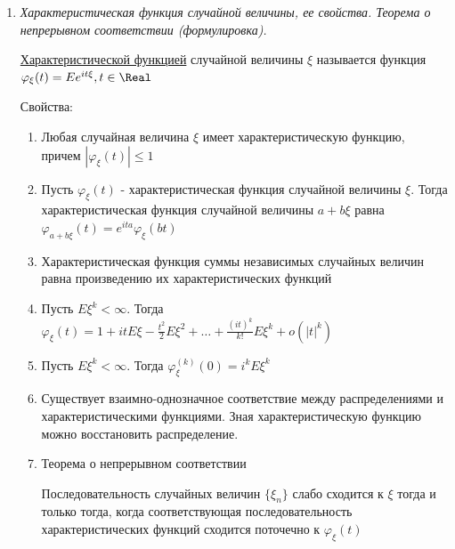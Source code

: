 \documentclass[12pt]{article}
\begin{document}
\begin{enumerate}
\begin{enumerate}
\begin{enumerate}
            \item Если $r_{\xi,\eta} = -1$, то $\eta = a\xi + b$ и $a < 0$ (обратная линейная зависимость)
        \end{enumerate}
    \end{enumerate}

    Если $r_{\xi,\eta} \neq 0$, то говорят, что случайные величины коррелированы друг с другом. Если $r_{\xi,\eta} > 0$, 
    то имеет прямая корреляция, если $r_{\xi,\eta} < 0$ - обратная

    \item \textit{Характеристическая функция случайной величины, ее свойства. Теорема о непрерывном соответствии (формулировка).}

    \hyperlink{characteristicfunction}{Характеристической функцией} случайной величины $\xi$ называется функция $\varphi_\xi(t) = Ee^{it\xi}, t \in \Real$
    
    Свойства:

    \begin{enumerate}
        \item Любая случайная величина $\xi$ имеет характеристическую функцию, причем $|\varphi_\xi(t)| \leq 1$

        \item Пусть $\varphi_\xi(t)$ - характеристическая функция случайной величины $\xi$. Тогда характеристическая функция
        случайной величины $a + b\xi$ равна $\varphi_{a + b\xi}(t) = e^{ita} \varphi_{\xi}(bt)$

        \item Характеристическая функция суммы независимых случайных величин равна произведению их характеристических функций

        \item Пусть $E\xi^k < \infty$. Тогда $\varphi_\xi(t) = 1 + it E\xi - \frac{t^2}{2}E\xi^2 + \dots + \frac{(it)^k}{k!} E\xi^k + o(|t|^k)$

        \item Пусть $E\xi^k < \infty$. Тогда $\varphi_\xi^{(k)}(0) = i^k E\xi^k$

        \item Существует взаимно-однозначное соответствие между распределениями и характеристическими функциями.
        Зная характеристическую функцию можно восстановить распределение.

        \item Теорема о непрерывном соответствии
        
        \Ths Последовательность случайных величин $\{\xi_n\}$ слабо сходится к $\xi$ тогда и только тогда, когда
            соответствующая последовательность характеристических функций сходится поточечно к $\varphi_\xi(t)$


\end{enumerate}
\end{enumerate}
\end{document}
